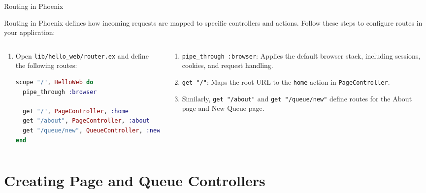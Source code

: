 \documentclass[aspectratio=169, table]{beamer}
\begin{document}
\begin{frame}[fragile]{Routing in Phoenix}
\vspace{15pt}

Routing in Phoenix defines how incoming requests are mapped to specific controllers and actions.  
Follow these steps to configure routes in your application:

\begin{columns}
  \begin{column}[T]{0.55\textwidth}
    \begin{enumerate}
      \item Open \texttt{lib/hello\_web/router.ex} and define the following routes:
\begin{lstlisting}[language=Elixir, basicstyle=\ttfamily\footnotesize]
scope "/", HelloWeb do
  pipe_through :browser
  
  get "/", PageController, :home
  get "/about", PageController, :about
  get "/queue/new", QueueController, :new
end
\end{lstlisting}
    \end{enumerate}
  \end{column}

  \begin{column}[T]{0.45\textwidth}
    \begin{enumerate}
        \item \texttt{pipe\_through :browser}: Applies the default browser stack, including sessions, cookies, and request handling.
        \item \texttt{get "/"}: Maps the root URL to the \texttt{home} action in \texttt{PageController}.
        \item Similarly, \texttt{get "/about"} and \texttt{get "/queue/new"} define routes for the About page and New Queue page.
    \end{enumerate}
  \end{column}
\end{columns}
\end{frame}

\section{Creating Page and Queue Controllers}
\end{document}

